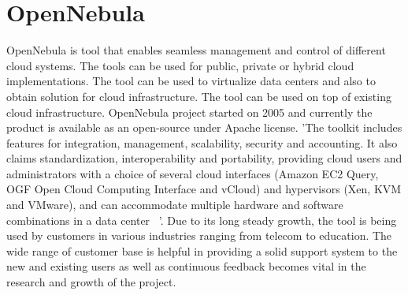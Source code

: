 \section{OpenNebula}

OpenNebula is tool that enables seamless management and control of different cloud systems.
The tools can be used for public, private or hybrid cloud implementations.
The tool can be used to virtualize data centers and also to obtain solution for cloud infrastructure.
The tool can be used on top of existing cloud infrastructure.
OpenNebula project started on 2005 and currently the product is available as an open-source under Apache license.
'The toolkit includes features for integration, management, scalability, security and accounting.
It also claims standardization, interoperability and portability, providing cloud users and administrators with a choice of several
cloud interfaces (Amazon EC2 Query, OGF Open Cloud Computing Interface and vCloud) and hypervisors
(Xen, KVM and VMware), and can accommodate multiple hardware and software combinations in a data center 
~\cite{hid-sp18-417-opennebula-wiki}'.
Due to its long steady growth, the tool is being used by customers in various industries ranging from telecom to education.
The wide range of customer base is helpful in providing a solid support system to the new and existing users as well as continuous
feedback becomes vital in the research and growth of the project. 
